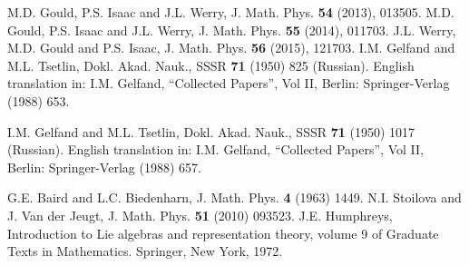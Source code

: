 \documentclass[12pt]{article}
\begin{document}
\newpage
\begin{thebibliography}{10}

%
%
% 
 M.D. Gould, P.S. Isaac and J.L. Werry, J. Math. Phys. {\bf 54} (2013), 013505.
% 
 M.D. Gould, P.S. Isaac and J.L. Werry, J. Math. Phys. {\bf 55} (2014), 011703.
%
 J.L. Werry, M.D. Gould and P.S. Isaac, J. Math. Phys. {\bf 56} (2015), 121703.
% 
%  
%
% 
%  
%  
I.M. Gelfand and M.L. Tsetlin, Dokl. Akad. Nauk., SSSR {\bf 71} (1950) 825 (Russian).
English translation in: I.M. Gelfand, ``Collected Papers'', Vol II, Berlin:
Springer-Verlag (1988) 653.
  
I.M. Gelfand and M.L. Tsetlin, Dokl. Akad. Nauk., SSSR {\bf 71} (1950) 1017 (Russian).
English translation in: I.M. Gelfand, ``Collected Papers'', Vol II, Berlin:
Springer-Verlag (1988) 657.
  
 G.E. Baird and L.C. Biedenharn, J. Math. Phys. {\bf 4} (1963) 1449.
%  
%  
% 
 N.I. Stoilova and J. Van der Jeugt, J. Math. Phys. {\bf 51} (2010) 093523.
% 
 J.E. Humphreys, Introduction to Lie algebras and representation theory, volume 9 of Graduate Texts in Mathematics. Springer, New York, 1972.



\end{thebibliography}
\end{document}
